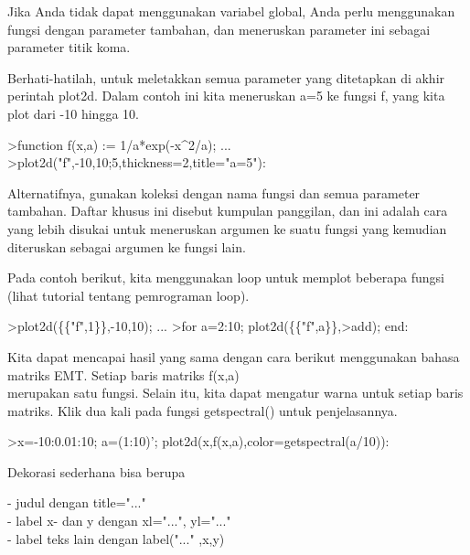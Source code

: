 \documentclass{article}
\begin{document}
\begin{eulernotebook}
\begin{eulercomment}
\begin{eulercomment}
\begin{eulercomment}
\begin{eulercomment}
\begin{eulercomment}
\begin{eulercomment}
\begin{eulercomment}
Jika  Anda  tidak  dapat  menggunakan  variabel  global,  Anda  perlu
menggunakan  fungsi  dengan  parameter  tambahan,  dan  meneruskan
parameter ini  sebagai  parameter  titik  koma.

Berhati-hatilah,  untuk  meletakkan  semua  parameter  yang ditetapkan
di  akhir  perintah  plot2d.  Dalam  contoh  ini  kita meneruskan a=5
ke  fungsi  f,  yang  kita  plot  dari  -10  hingga  10.
\end{eulercomment}
\begin{eulerprompt}
>function f(x,a) := 1/a*exp(-x^2/a); ...
>plot2d("f",-10,10;5,thickness=2,title="a=5"):
\end{eulerprompt}
\begin{eulercomment}
Alternatifnya,  gunakan  koleksi  dengan  nama  fungsi  dan  semua
parameter  tambahan.  Daftar  khusus  ini  disebut  kumpulan
panggilan, dan  ini  adalah  cara  yang  lebih  disukai  untuk
meneruskan  argumen ke  suatu  fungsi  yang  kemudian  diteruskan
sebagai argumen  ke fungsi lain.

Pada  contoh  berikut,  kita  menggunakan  loop  untuk  memplot
beberapa fungsi  (lihat  tutorial  tentang  pemrograman  loop).
\end{eulercomment}
\begin{eulerprompt}
>plot2d(\{\{"f",1\}\},-10,10); ...
>for a=2:10; plot2d(\{\{"f",a\}\},>add); end:
\end{eulerprompt}
\begin{eulercomment}
Kita  dapat  mencapai  hasil  yang  sama  dengan  cara berikut
menggunakan  bahasa  matriks  EMT.  Setiap  baris  matriks  f(x,a)  \\
merupakan  satu  fungsi.  Selain  itu,  kita  dapat  mengatur  warna
untuk  setiap  baris  matriks.  Klik  dua  kali  pada fungsi
getspectral() untuk  penjelasannya.
\end{eulercomment}
\begin{eulerprompt}
>x=-10:0.01:10; a=(1:10)'; plot2d(x,f(x,a),color=getspectral(a/10)):
\end{eulerprompt}
\begin{eulercomment}
Dekorasi  sederhana  bisa  berupa

-  judul  dengan  title="..."\\
-  label  x-  dan  y  dengan  xl="...", yl="..."\\
-  label  teks  lain  dengan  label("..." ,x,y)


\end{eulercomment}
\end{eulercomment}
\end{eulercomment}
\end{eulercomment}
\end{eulercomment}
\end{eulercomment}
\end{eulercomment}
\end{eulernotebook}
\end{document}
